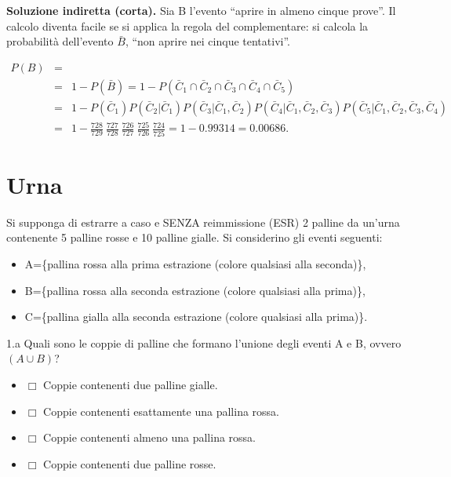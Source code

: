 \documentclass[
  11pt,
]{book}
\providecommand{\tightlist}{%
  \setlength{\itemsep}{0pt}\setlength{\parskip}{0pt}}
\theoremstyle{mytheoremstyle}
\theoremstyle{mydefstyle}
\newenvironment{sol}
  {
  \begin{tcolorbox}[enhanced,breakable,arc=0.1mm,boxrule=1pt,colback=white,colframe=iblue,
  title=\bf \fontfamily{lmss}\selectfont \hspace{.5 cm} Soluzione,drop fuzzy shadow]

}{
\end{tcolorbox}
  }
\begin{document}
\begin{sol}
\textbf{Soluzione indiretta (corta).}
Sia B l'evento ``aprire in almeno cinque prove''.
Il calcolo diventa facile se si applica la regola del complementare:
si calcola la probabilità dell'evento \(\bar{B}\), ``non aprire nei
cinque tentativi''.

\begin{eqnarray*}
 P(B) &=& \\
&=& 1 - P(\bar{B})
 =  1 - P(\bar{C}_{1} \cap \bar{C}_{2} \cap \bar{C}_{3} \cap
          \bar{C}_{4} \cap \bar{C}_{5}) \\
&=& 1 - P(\bar{C}_{1}) P(\bar{C}_{2}  |  \bar{C}_{1})  
        P(\bar{C}_{3}  |  \bar{C}_{1}, \bar{C}_{2})  
        P(\bar{C}_{4}  |  \bar{C}_{1}, \bar{C}_{2}, \bar{C}_{3})  
        P(\bar{C}_{5}  |  \bar{C}_{1}, \bar{C}_{2}, \bar{C}_{3}, \bar{C}_{4}) \\
&=& 1 - \frac{728} {729}\ \frac{727} {728}\ \frac{726} {727}\ \frac{725} {726}\ \frac{724} {725}
 =  1 - 0.99314 = 0.00686  .
\end{eqnarray*}

\end{sol}

\section{Urna}\label{urna}

Si supponga di estrarre a caso e SENZA reimmissione (ESR) 2 palline
da un'urna contenente 5 palline rosse e 10 palline gialle.
Si considerino gli eventi seguenti:

\begin{itemize}
\tightlist
\item
  A=\{pallina rossa alla prima estrazione (colore qualsiasi alla seconda)\},
\item
  B=\{pallina rossa alla seconda estrazione (colore qualsiasi alla prima)\},
\item
  C=\{pallina gialla alla seconda estrazione (colore qualsiasi alla prima)\}.
\end{itemize}

1.a Quali sono le coppie di palline che formano l'unione
degli eventi A e B, ovvero \((A \cup B)\)?

\begin{itemize}
\tightlist
\item
  \(\Box\) Coppie contenenti due palline gialle.
\item
  \(\Box\) Coppie contenenti esattamente una pallina rossa.
\item
  \(\Box\) Coppie contenenti almeno una pallina rossa.
\item
  \(\Box\) Coppie contenenti due palline rosse.
\end{itemize}
\end{document}

